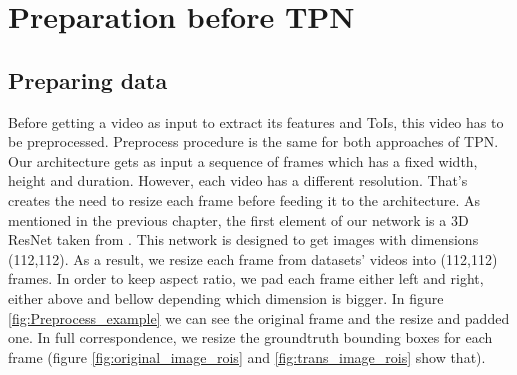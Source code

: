 \section{Preparation before TPN}

\subsection{Preparing data}
Before getting a video as input to extract its features and ToIs, this video has to be preprocessed.
Preprocess procedure  is the same for both approaches of TPN.
Our architecture gets as input a sequence of frames which has a fixed  width, height and duration. However, each video has a different resolution. That's creates the
need to resize each frame before feeding it to the architecture.
As mentioned in the previous chapter, the first element of our network is a 3D ResNet taken from \cite{hara3dcnns}. This network is designed to
get images with dimensions (112,112). As a result, we resize each frame from datasets' videos into (112,112) frames. In order to keep aspect ratio, we pad each frame either
left and right, either above and bellow depending which dimension is bigger. In figure  \ref{fig:Preprocess_example} we can see the original frame and the resize and padded one.
In full correspondence, we resize the groundtruth bounding boxes for each frame (figure \ref{fig:original_image_rois} and \ref{fig:trans_image_rois} show that).

